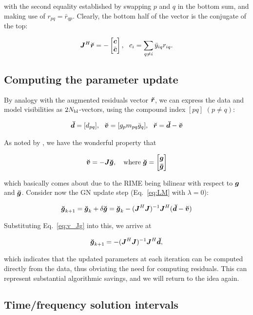 \documentclass[useAMS,usenatbib]{mn2e}
\newcommand{\mat}[1]{{\bmath{#1}}}
\newcommand{\JJ}{\mat{J}} %
\newcommand{\JHJ}{\JJ^H\JJ} %
\begin{document}
with the second equality established by swapping $p$ and $q$ in the bottom sum, and making use of $r_{pq}=\bar{r}_{qp}$. Clearly, the bottom half of the vector is the conjugate of the top:

\begin{equation}
\label{eq:JHR:DI1}
\JJ^H\Rr = -\Matrix{c}{\bmath{c}\\\bar{\bmath{c}}},~~c_i = \sum\limits_{q\ne i} \bar{y}_{iq} r_{iq}.
\end{equation}

\subsection{Computing the parameter update}

By analogy with the augmented residuals vector $\Rr$, we can express the data and model visibilities as $2N_\mathrm{bl}$-vectors,
using the compound index $[pq]$ $(p\ne q)$:

\[
\Dd = [ d_{pq} ],~~\Vv = [ g_p m_{pq} \bar{g}_q ],~~\Rr =\Dd-\Vv
\]

As noted by \citet{tasse:cohjones}, we have the wonderful property that

\begin{equation}
\label{eq:v_Jg}
\Vv = -\JJ \Gg,~~~\mathrm{where}~\Gg = \Matrix{c}{\bmath{g} \\ \bmath{\bar g}}
\end{equation}

which basically comes about due to the RIME being bilinear with respect to $\bmath{g}$ and $\bmath{\bar g}$. Consider now the GN update step (Eq.~\ref{eq:LM} with $\lambda=0$):

\[
\Gg_{k+1} = \Gg_k + \delta\Gg = \Gg_k - (\JHJ)^{-1} \JJ^H (\Dd - \Vv)
\]

Substituting Eq.~\ref{eq:v_Jg} into this, we arrive at

\begin{equation}
\label{eq:ghat}
\Gg_{k+1} = -(\JHJ)^{-1} \JJ^H \Dd,
\end{equation}

which indicates that the updated parameters at each iteration can be computed directly from the data, thus obviating the need
for computing residuals. This can represent substantial algorithmic savings, and we will return to the idea again.


\subsection{Time/frequency solution intervals}
\label{sec:unpol:DI:avg}
\label{sec:solution-intervals}
\end{document}
